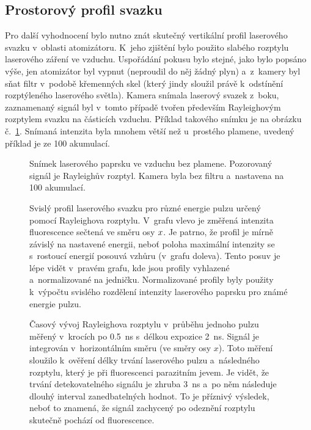 \subsection{Prostorový profil svazku}
\label{sec:lif-rayleigh}
Pro další vyhodnocení bylo nutno znát skutečný vertikální profil
laserového svazku v~oblasti atomizátoru.
K~jeho zjištění bylo použito slabého rozptylu laserového záření ve vzduchu.
Uspořádání pokusu bylo stejné, jako bylo popsáno výše,
jen atomizátor byl vypnut (neproudil do něj žádný plyn)
a~z~kamery byl sňat filtr v~podobě křemenných skel
(který jindy sloužil právě k~odstínění rozptýleného laserového světla).
Kamera snímala laserový svazek z~boku, zaznamenaný signál byl v~tomto
případě tvořen především Rayleighovým rozptylem svazku na částicích vzduchu.
Příklad takového snímku je na obrázku č.~\ref{fig:lif-beam}.
Snímaná intenzita byla mnohem větší než u~prostého plamene,
uvedený příklad je ze \num{100} akumulací.

\begin{figure}[htp]
	\centering
	
	\caption{Snímek laserového paprsku ve vzduchu bez plamene.
		Pozorovaný signál je Rayleighův rozptyl.
		Kamera byla bez filtru a~nastavena na \num{100} akumulací.}
	\label{fig:lif-beam}
\end{figure}

\begin{figure}
	\centering
	\hfill
	
	\caption{Svislý profil laserového svazku pro různé energie pulzu
		určený pomocí Rayleighova rozptylu.
		V~grafu vlevo je změřená intenzita fluorescence sečtená
		ve směru osy $x$.
		Je patrno, že profil je mírně závislý na nastavené energii,
		neboť poloha maximální intenzity se s~rostoucí energií posouvá
		vzhůru (v~grafu doleva).
		Tento posuv je lépe vidět v~pravém grafu, kde jsou profily
		vyhlazené a~normalizované na jedničku.
		Normalizované profily byly použity k~výpočtu svislého
		rozdělení intenzity laserového paprsku pro známé energie pulzu.}
	\label{fig:lif-rayleigh-profile}
\end{figure}

\begin{figure}
	\centerline{}
	\caption{Časový vývoj Rayleighova rozptylu v~průběhu jednoho pulzu
		měřený v~krocích po \SI{0.5}{\nano\second}
		s~délkou expozice \SI{2}{\nano\second}.
		Signál je integrován v~horizontálním směru (ve směry osy $x$).
		Toto měření sloužilo k~ověření délky trvání laserového pulzu
		a~následného rozptylu, který je při fluorescenci parazitním jevem.
		Je vidět, že trvání detekovatelného signálu je zhruba
		\SI{3}{\nano\second} a~po něm následuje dlouhý interval
		zanedbatelných hodnot.
		To je příznivý výsledek, neboť to znamená, že signál zachycený
		po odeznění rozptylu skutečně pochází od fluorescence.}
	\label{fig:lif-rayleigh-time}
\end{figure}

